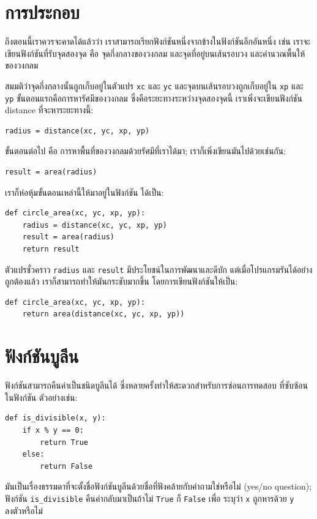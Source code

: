 \section{การประกอบ}%

ถึงตอนนี้เราควรจะคาดได้แล้วว่า เราสามารถเรียกฟังก์ชันหนึ่งจากข้างในฟังก์ชันอีกอันหนึ่ง เช่น 
เราจะเขียนฟังก์ชันที่รับจุดสองจุด คือ จุดกึ่งกลางของวงกลม และจุดที่อยู่บนเส้นรอบวง
และคำนวณพื้นให้ของวงกลม

สมมติว่าจุดกึ่งกลางนั้นถูกเก็บอยู่ในตัวแปร {\tt xc} และ {\tt yc} และจุดบนเส้นรอบวงถูกเก็บอยู่ใน
{\tt xp} และ {\tt yp} ขั้นตอนแรกคือการหารัศมีของวงกลม ซึ่งคือระยะทางระหว่างจุดสองจุดนี้
เราเพิ่งจะเขียนฟังก์ชัน distance ที่จะหาระยะทางนี้:

\begin{verbatim}
radius = distance(xc, yc, xp, yp)
\end{verbatim}
%
ขั้นตอนต่อไป คือ การหาพื้นที่ของวงกลมด้วยรัศมีที่เราได้มา; เราก็เพิ่งเขียนมันไปด้วยเช่นกัน:

\begin{verbatim}
result = area(radius)
\end{verbatim}
%
เราก็ห่อหุ้มขั้นตอนเหล่านี้ให้มาอยู่ในฟังก์ชัน ได้เป็น:

\begin{verbatim}
def circle_area(xc, yc, xp, yp):
    radius = distance(xc, yc, xp, yp)
    result = area(radius)
    return result
\end{verbatim}
%
ตัวแปรชั่วคราว {\tt radius} และ {\tt result} มีประโยชน์ในการพัฒนาและดีบัก
แต่เมื่อโปรแกรมรันได้อย่างถูกต้องแล้ว เราก็สามารถทำให้มันกระชับมากขึ้น โดยการเขียนฟังก์ชันให้เป็น:

\begin{verbatim}
def circle_area(xc, yc, xp, yp):
    return area(distance(xc, yc, xp, yp))
\end{verbatim}
%


\section{ฟังก์ชันบูลีน } %
\label{boolean}

ฟังก์ชันสามารถคืนค่าเป็นชนิดบูลีนได้ ซึ่งหลายครั้งทำให้สะดวกสำหรับการซ่อนการทดสอบ
ที่ซับซ้อนในฟังก์ชัน
ตัวอย่างเช่น:

\begin{verbatim}
def is_divisible(x, y):
    if x % y == 0:
        return True
    else:
        return False
\end{verbatim}
%
มันเป็นเรื่องธรรมดาที่จะตั้งชื่อฟังก์ชันบูลีนด้วยชื่อที่ฟังคล้ายกับคำถามใช่หรือไม่ (yes/no
question); ฟังก์ชัน \verb"is_divisible" คืนค่ากลับมาเป็นถ้าไม่ {\tt True} ก็ {\tt False} เพื่อ
ระบุว่า {\tt x} ถูกหารด้วย {\tt y} ลงตัวหรือไม่

